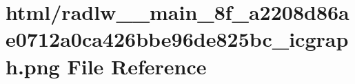 \hypertarget{radlw____main__8f__a2208d86ae0712a0ca426bbe96de825bc__icgraph_8png}{}\section{html/radlw\+\_\+\+\_\+main\+\_\+8f\+\_\+a2208d86ae0712a0ca426bbe96de825bc\+\_\+icgraph.png File Reference}
\label{radlw____main__8f__a2208d86ae0712a0ca426bbe96de825bc__icgraph_8png}
